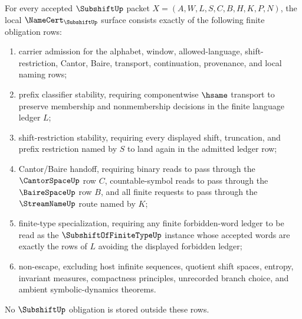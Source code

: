\begin{theorem}
\label{thm:subshift-namecert-obligations}
For every accepted $\SubshiftUp$ packet $X=(A,W,L,S,C,B,H,K,P,N)$, the local $\NameCert_{\SubshiftUp}$ surface consists exactly of the following finite obligation rows:
\begin{enumerate}
\item carrier admission for the alphabet, window, allowed-language, shift-restriction, Cantor, Baire, transport, continuation, provenance, and local naming rows;
\item prefix classifier stability, requiring componentwise $\hsame$ transport to preserve membership and nonmembership decisions in the finite language ledger $L$;
\item shift-restriction stability, requiring every displayed shift, truncation, and prefix restriction named by $S$ to land again in the admitted ledger row;
\item Cantor/Baire handoff, requiring binary reads to pass through the $\CantorSpaceUp$ row $C$, countable-symbol reads to pass through the $\BaireSpaceUp$ row $B$, and all finite requests to pass through the $\StreamNameUp$ route named by $K$;
\item finite-type specialization, requiring any finite forbidden-word ledger to be read as the $\SubshiftOfFiniteTypeUp$ instance whose accepted words are exactly the rows of $L$ avoiding the displayed forbidden ledger;
\item non-escape, excluding host infinite sequences, quotient shift spaces, entropy, invariant measures, compactness principles, unrecorded branch choice, and ambient symbolic-dynamics theorems.
\end{enumerate}
No $\SubshiftUp$ obligation is stored outside these rows.
\end{theorem}
